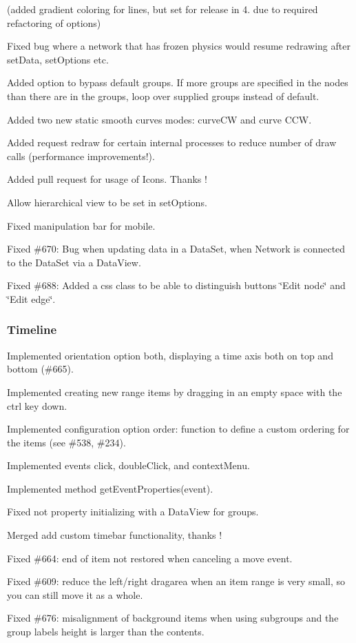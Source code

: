 \begin{DoxyItemize}
\item (added gradient coloring for lines, but set for release in 4. due to required refactoring of options)
\item Fixed bug where a network that has frozen physics would resume redrawing after set\+Data, set\+Options etc.
\item Added option to bypass default groups. If more groups are specified in the nodes than there are in the groups, loop over supplied groups instead of default.
\item Added two new static smooth curves modes\+: curve\+CW and curve C\+CW.
\item Added request redraw for certain internal processes to reduce number of draw calls (performance improvements!).
\item Added pull request for usage of Icons. Thanks !
\item Allow hierarchical view to be set in set\+Options.
\item Fixed manipulation bar for mobile.
\item Fixed \#670\+: Bug when updating data in a Data\+Set, when Network is connected to the Data\+Set via a Data\+View.
\item Fixed \#688\+: Added a css class to be able to distinguish buttons \char`\"{}\+Edit node\char`\"{} and \char`\"{}\+Edit edge\char`\"{}.
\end{DoxyItemize}

\subsubsection*{Timeline}


\begin{DoxyItemize}
\item Implemented orientation option {\ttfamily \textquotesingle{}both\textquotesingle{}}, displaying a time axis both on top and bottom (\#665).
\item Implemented creating new range items by dragging in an empty space with the ctrl key down.
\item Implemented configuration option {\ttfamily order\+: function} to define a custom ordering for the items (see \#538, \#234).
\item Implemented events {\ttfamily click}, {\ttfamily double\+Click}, and {\ttfamily context\+Menu}.
\item Implemented method {\ttfamily get\+Event\+Properties(event)}.
\item Fixed not property initializing with a Data\+View for groups.
\item Merged add custom timebar functionality, thanks !
\item Fixed \#664\+: end of item not restored when canceling a move event.
\item Fixed \#609\+: reduce the left/right dragarea when an item range is very small, so you can still move it as a whole.
\item Fixed \#676\+: misalignment of background items when using subgroups and the group label\textquotesingle{}s height is larger than the contents.
\end{DoxyItemize}


